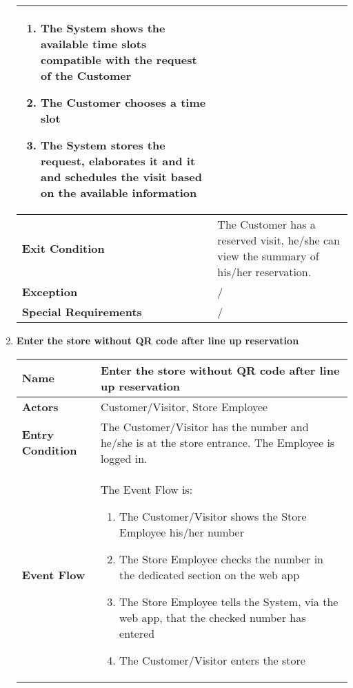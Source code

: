 \begin{enumerate}
{\begin{longtable}{|L{4cm}|L{10cm}|}
\begin{enumerate}
                        \item The System shows the available time slots compatible with the request of the Customer
                        \item The Customer chooses a time slot
                        \item The System stores the request, elaborates it and it and schedules the visit based on the available information
                    \end{enumerate} \\
                \hline
                \textbf{Exit Condition} & The Customer has a reserved visit, he/she can view the summary of his/her reservation. \\
                \hline
                \textbf{Exception} & / \\
                \hline
                \textbf{Special Requirements} & / \\
                \hline
            \end{longtable}}
            \item \textbf{Enter the store without QR code after line up reservation}{\renewcommand{\arraystretch}{2}
            \begin{longtable}{|L{4cm}|L{10cm}|}
                \hline
                \textbf{Name} & Enter the store without QR code after line up reservation \\
                \hline
                \textbf{Actors} & Customer/Visitor, Store Employee \\
                \hline
                \textbf{Entry Condition} & The Customer/Visitor has the number and he/she is at the store entrance. The Employee is logged in. \\
                \hline
                \textbf{Event Flow} & The Event Flow is: \begin{enumerate}
                        \item The Customer/Visitor shows the Store Employee his/her number
                        \item The Store Employee checks the number in the dedicated section on the web app
                        \item The Store Employee tells the System, via the web app, that the checked number has entered
                        \item The Customer/Visitor enters the store
                    \end{enumerate} \\

\end{longtable}}
\end{enumerate}
